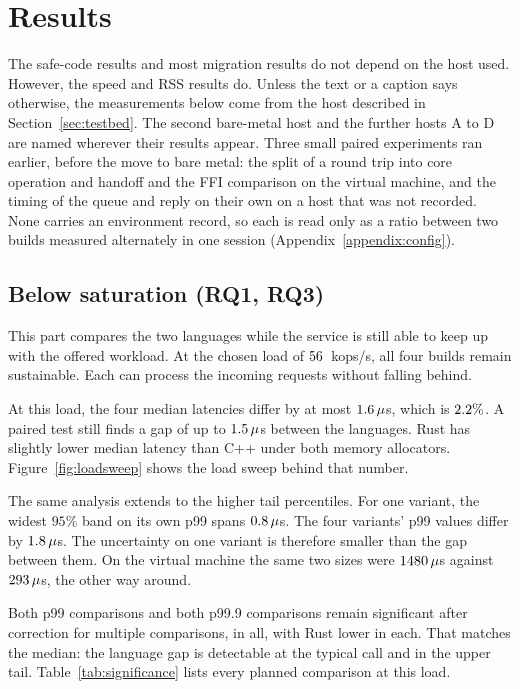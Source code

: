 \documentclass[english,oneside,a4paper,censored,csm,software-track-2020]{HYthesisML}
\begin{document}
\section{Results}
The safe-code results and most migration results do not depend on the host used. 
However, the speed and RSS results do.
Unless the text or a caption says otherwise, the measurements below come from the host
described in Section~\ref{sec:testbed}. The second bare-metal host and the further hosts
A to D are named wherever their results appear. Three small paired experiments ran earlier,
before the move to bare metal: the split of a round trip into core operation and handoff
and the FFI comparison on the virtual machine, and the timing of the queue and reply on
their own on a host that was not recorded. None carries an environment record, so each is
read only as a ratio between two builds measured alternately in one session
(Appendix~\ref{appendix:config}).
\subsection{Below saturation (RQ1, RQ3)}\label{sec:perfresults}
This part compares the two languages while the service is still able to
keep up with the offered workload. At the chosen load of $56$~kops/s,
all four builds remain sustainable. Each can process the incoming requests
without falling behind.

At this load, the four median latencies differ by at most
$1.6\,\mu$s, which is $2.2\%$. A paired test still finds a
gap of up to $1.5\,\mu$s between the languages. Rust has slightly
lower median latency than C++ under both memory allocators.
Figure~\ref{fig:loadsweep} shows the load sweep behind that number.

The same analysis extends to the higher tail percentiles. For one variant,
the widest $95\%$ band on its own p99 spans $0.8\,\mu$s. The four
variants' p99 values differ by $1.8\,\mu$s. The uncertainty on
one variant is therefore smaller than the gap between them. On the virtual
machine the same two sizes were $1480\,\mu$s against
$293\,\mu$s, the other way around.

Both p99 comparisons and both p99.9 comparisons remain significant after
correction for multiple comparisons, \NTailSignificant{} in all, with Rust
lower in each. That matches the median: the language gap is detectable at the
typical call and in the upper tail. Table~\ref{tab:significance} lists every
planned comparison at this load.
\end{document}
